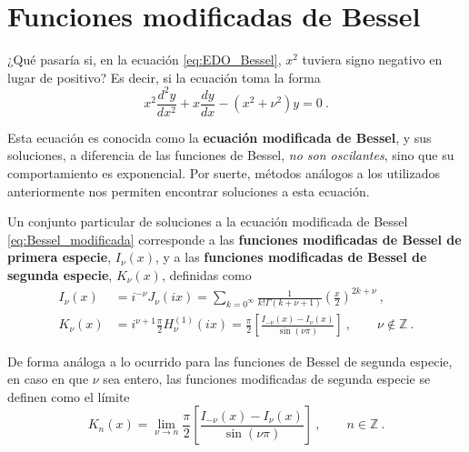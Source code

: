 \section{Funciones modificadas de Bessel}

¿Qué pasaría si, en la ecuación \eqref{eq:EDO_Bessel}, $x^2$ tuviera signo negativo en lugar de positivo? Es decir, si la ecuación toma la forma
\begin{equation}\label{eq:Bessel_modificada}
    x^2 \frac{d^2y}{dx^2} + x \frac{dy}{dx} - (x^2 + \nu^2)y = 0 \ . 
\end{equation}

Esta ecuación es conocida como la \textbf{ecuación modificada de Bessel}, y sus soluciones, a diferencia de las funciones de Bessel, \emph{no son oscilantes}, sino que su comportamiento es exponencial. Por suerte, métodos análogos a los utilizados anteriormente nos permiten encontrar soluciones a esta ecuación.

\begin{defi} 
    Un conjunto particular de soluciones a la ecuación modificada de Bessel \eqref{eq:Bessel_modificada} corresponde a las \textbf{funciones modificadas de Bessel de primera especie}, $I_\nu(x)$, y a las \textbf{funciones modificadas de Bessel de segunda especie}, $K_\nu(x)$, definidas como
    \begin{align}
        I_\nu(x) & = i^{-\nu} J_\nu(ix) = \sum_{k=0^\infty} \frac{1}{k! \Gamma(k+\nu+1)} \left( \frac{x}{2} \right)^{2k+\nu} \ , \\
        K_\nu(x) & = i^{\nu + 1} \frac{\pi}{2} H_\nu^{(1)}(ix) = \frac{\pi}{2} \left[ \frac{I_{-\nu}(x) - I_\nu(x)}{\sin(\nu \pi)} \right] \ , \qquad \nu \notin \mathbb{Z} \ .
    \end{align}
\end{defi}

De forma análoga a lo ocurrido para las funciones de Bessel de segunda especie, en caso en que $\nu$ sea entero, las funciones modificadas de segunda especie se definen como el límite
\begin{equation}
    K_n(x) = \lim_{\nu \to n} \frac{\pi}{2} \left[ \frac{I_{-\nu}(x) - I_\nu(x)}{\sin(\nu \pi)} \right] \ , \qquad n \in \mathbb{Z} \ .
\end{equation}

